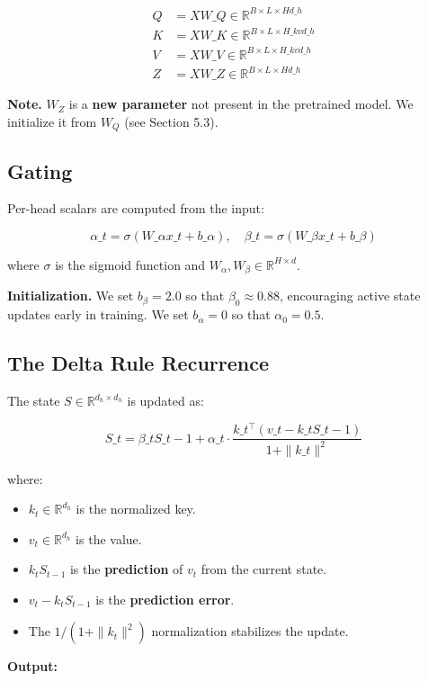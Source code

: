 \[
\begin{aligned}
Q &= X W\_Q \in \mathbb{R}^{B \times L \times H d\_h} \\
K &= X W\_K \in \mathbb{R}^{B \times L \times H\_{kv} d\_h} \\
V &= X W\_V \in \mathbb{R}^{B \times L \times H\_{kv} d\_h} \\
Z &= X W\_Z \in \mathbb{R}^{B \times L \times H d\_h}
\end{aligned}
\tag{4.1}
\]

\textbf{Note.} $W_Z$ is a \textbf{new parameter} not present in the pretrained model. 
We initialize it from $W_Q$ (see Section 5.3).

\subsection{Gating}

Per-head scalars are computed from the input:

\[
\alpha\_t = \sigma(W\_\alpha x\_t + b\_\alpha), \quad
\beta\_t = \sigma(W\_\beta x\_t + b\_\beta)
\tag{4.2}
\]

where $\sigma$ is the sigmoid function and $W_\alpha, W_\beta \in \mathbb{R}^{H \times d}$.

\textbf{Initialization.} We set $b_\beta = 2.0$ so that $\beta_0 \approx 0.88$, 
encouraging active state updates early in training. We set $b_\alpha = 0$ 
so that $\alpha_0 = 0.5$.

\subsection{The Delta Rule Recurrence}

The state $S \in \mathbb{R}^{d_h \times d_h}$ is updated as:

\[
\boxed{
S\_t = \beta\_t S\_{t-1} + \alpha\_t \cdot \frac{k\_t^\top (v\_t - k\_t S\_{t-1})}{1 + \|k\_t\|^2}
}
\tag{4.3}
\]

where:
\begin{itemize}
\item $k_t \in \mathbb{R}^{d_h}$ is the normalized key.
\item $v_t \in \mathbb{R}^{d_h}$ is the value.
\item $k_t S_{t-1}$ is the \textbf{prediction} of $v_t$ from the current state.
\item $v_t - k_t S_{t-1}$ is the \textbf{prediction error}.
\item The $1 / (1 + \|k_t\|^2)$ normalization stabilizes the update.

\end{itemize}
\textbf{Output:}

